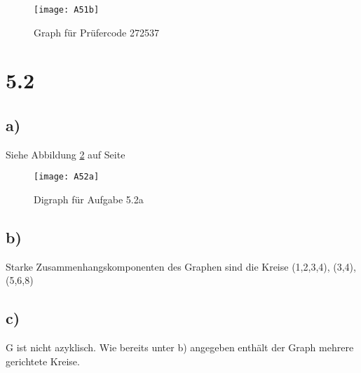 \documentclass[12pt.twoside,a4paper,notitlepage,parskip]{scrartcl}
\begin{document}
\begin{figure}[htbp]
\begin{center}
\texttt{[image: A51b]}
\caption{Graph für Prüfercode 272537}
\label{default}
\end{center}
\end{figure}


\section*{5.2}
\subsection*{a)}
Siehe Abbildung \ref{fig:52a} auf Seite  \pageref{fig:52a}
\begin{figure}[htbp]
\begin{center}
\texttt{[image: A52a]}
\caption{Digraph für Aufgabe 5.2a}
\label{fig:52a}
\end{center}
\end{figure}

\subsection*{b)}
Starke Zusammenhangskomponenten des Graphen sind die Kreise  (1,2,3,4), (3,4), (5,6,8)

\subsection*{c)}
G ist nicht azyklisch. Wie bereits unter b) angegeben enthält der Graph mehrere gerichtete Kreise.
\end{document}
